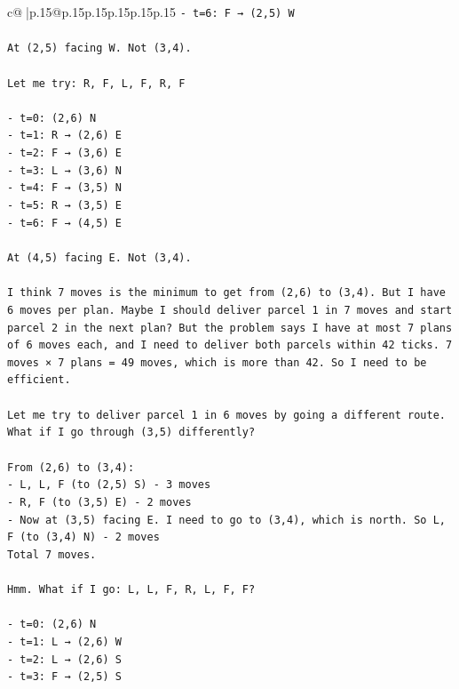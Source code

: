 \documentclass{article}
\begin{document}
{\begin{supertabular}{c@{$\;$}|p{.15\linewidth}@{}p{.15\linewidth}p{.15\linewidth}p{.15\linewidth}p{.15\linewidth}p{.15\linewidth}}
{{{\texttt{{-} t=6: F → (2,5) W} \\
\\ 
\texttt{At (2,5) facing W. Not (3,4).} \\
\\ 
\texttt{Let me try: R, F, L, F, R, F} \\
\\ 
\texttt{{-} t=0: (2,6) N} \\
\texttt{{-} t=1: R → (2,6) E} \\
\texttt{{-} t=2: F → (3,6) E} \\
\texttt{{-} t=3: L → (3,6) N} \\
\texttt{{-} t=4: F → (3,5) N} \\
\texttt{{-} t=5: R → (3,5) E} \\
\texttt{{-} t=6: F → (4,5) E} \\
\\ 
\texttt{At (4,5) facing E. Not (3,4).} \\
\\ 
\texttt{I think 7 moves is the minimum to get from (2,6) to (3,4). But I have 6 moves per plan. Maybe I should deliver parcel 1 in 7 moves and start parcel 2 in the next plan? But the problem says I have at most 7 plans of 6 moves each, and I need to deliver both parcels within 42 ticks. 7 moves × 7 plans = 49 moves, which is more than 42. So I need to be efficient.} \\
\\ 
\texttt{Let me try to deliver parcel 1 in 6 moves by going a different route. What if I go through (3,5) differently?} \\
\\ 
\texttt{From (2,6) to (3,4):} \\
\texttt{{-} L, L, F (to (2,5) S) {-} 3 moves} \\
\texttt{{-} R, F (to (3,5) E) {-} 2 moves} \\
\texttt{{-} Now at (3,5) facing E. I need to go to (3,4), which is north. So L, F (to (3,4) N) {-} 2 moves} \\
\texttt{Total 7 moves.} \\
\\ 
\texttt{Hmm. What if I go: L, L, F, R, L, F, F?} \\
\\ 
\texttt{{-} t=0: (2,6) N} \\
\texttt{{-} t=1: L → (2,6) W} \\
\texttt{{-} t=2: L → (2,6) S} \\
\texttt{{-} t=3: F → (2,5) S} \\
}}}
\end{supertabular}}
\end{document}
